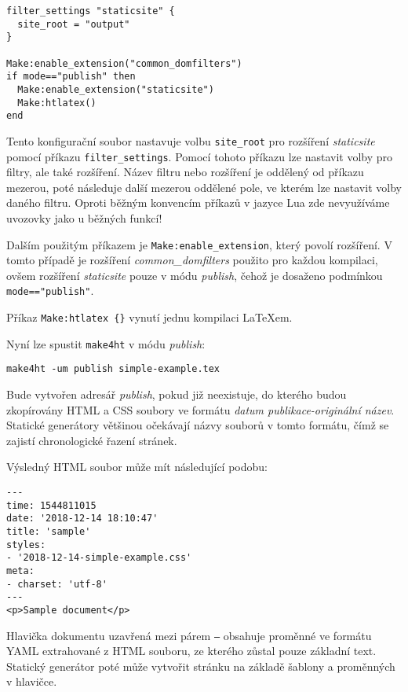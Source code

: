 \documentclass{csbulletin}
\newcommand\nazev[1]{\textit{#1}}
\newcommand\prikaz[1]{\texttt{#1}}
\begin{document}
\begin{verbatim}
filter_settings "staticsite" {
  site_root = "output" 
}

Make:enable_extension("common_domfilters")
if mode=="publish" then
  Make:enable_extension("staticsite")
  Make:htlatex()
end

\end{verbatim}

Tento konfigurační soubor nastavuje volbu \texttt{site\_root} pro rozšíření
\nazev{staticsite} pomocí příkazu \verb|filter_settings|. Pomocí tohoto příkazu
lze nastavit volby pro filtry, ale také rozšíření. Název filtru nebo rozšíření
je oddělený od příkazu mezerou, poté následuje další mezerou oddělené pole, ve
kterém lze nastavit volby daného filtru. Oproti běžným konvencím příkazů v
jazyce Lua zde nevyužíváme uvozovky jako u běžných funkcí!

Dalším použitým příkazem je \verb|Make:enable_extension|, který povolí
rozšíření. V tomto případě je rozšíření \nazev{common\_domfilters} použito pro
každou kompilaci, ovšem rozšíření \nazev{staticsite} pouze v módu
\nazev{publish}, čehož je dosaženo podmínkou \verb|mode=="publish"|.

Příkaz \verb|Make:htlatex {}| vynutí jednu kompilaci \LaTeX em. 

Nyní lze spustit \prikaz{make4ht} v módu \nazev{publish}: 

\begin{verbatim}
make4ht -um publish simple-example.tex
\end{verbatim}

Bude vytvořen adresář \nazev{publish}, pokud již neexistuje, do kterého budou
zkopírovány HTML a CSS soubory ve formátu \textit{datum publikace-originální
název}. Statické generátory většinou očekávají názvy souborů v tomto formátu,
čímž se zajistí chronologické řazení stránek.

Výsledný HTML soubor může mít následující podobu:

\begin{verbatim}
---
time: 1544811015
date: '2018-12-14 18:10:47'
title: 'sample'
styles:
- '2018-12-14-simple-example.css'
meta:
- charset: 'utf-8'
---
<p>Sample document</p>
\end{verbatim}


Hlavička dokumentu uzavřená mezi párem \texttt{---} obsahuje proměnné ve
formátu YAML extrahované z HTML souboru, ze kterého zůstal pouze základní text.
Statický generátor poté může vytvořit stránku na základě šablony a proměnných v
hlavičce. 
\end{document}
